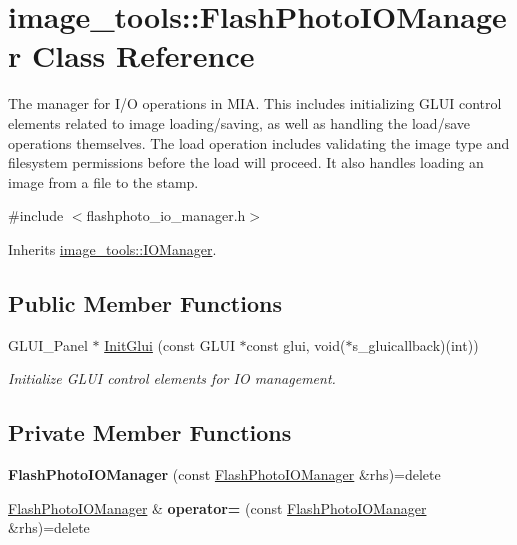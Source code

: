 \hypertarget{classimage__tools_1_1FlashPhotoIOManager}{}\section{image\+\_\+tools\+:\+:Flash\+Photo\+I\+O\+Manager Class Reference}
\label{classimage__tools_1_1FlashPhotoIOManager}


The manager for I/O operations in M\+IA. This includes initializing G\+L\+UI control elements related to image loading/saving, as well as handling the load/save operations themselves. The load operation includes validating the image type and filesystem permissions before the load will proceed. It also handles loading an image from a file to the stamp.  




{\ttfamily \#include $<$flashphoto\+\_\+io\+\_\+manager.\+h$>$}



Inherits \hyperlink{classimage__tools_1_1IOManager}{image\+\_\+tools\+::\+I\+O\+Manager}.

\subsection*{Public Member Functions}
\begin{DoxyCompactItemize}
\item 
G\+L\+U\+I\+\_\+\+Panel $\ast$ \hyperlink{classimage__tools_1_1FlashPhotoIOManager_a7acdb048b976e0efa9f4b65adf07faf8}{Init\+Glui} (const G\+L\+UI $\ast$const glui, void($\ast$s\+\_\+gluicallback)(int))
\begin{DoxyCompactList}\small\item\em Initialize G\+L\+UI control elements for IO management. \end{DoxyCompactList}\end{DoxyCompactItemize}
\subsection*{Private Member Functions}
\begin{DoxyCompactItemize}
\item 
{\bfseries Flash\+Photo\+I\+O\+Manager} (const \hyperlink{classimage__tools_1_1FlashPhotoIOManager}{Flash\+Photo\+I\+O\+Manager} \&rhs)=delete\hypertarget{classimage__tools_1_1FlashPhotoIOManager_ac29f81ca4d2878f3b52a9e2e562a0e9f}{}\label{classimage__tools_1_1FlashPhotoIOManager_ac29f81ca4d2878f3b52a9e2e562a0e9f}

\item 
\hyperlink{classimage__tools_1_1FlashPhotoIOManager}{Flash\+Photo\+I\+O\+Manager} \& {\bfseries operator=} (const \hyperlink{classimage__tools_1_1FlashPhotoIOManager}{Flash\+Photo\+I\+O\+Manager} \&rhs)=delete\hypertarget{classimage__tools_1_1FlashPhotoIOManager_a72220e79d2e47a7b00232649fee0c29a}{}\label{classimage__tools_1_1FlashPhotoIOManager_a72220e79d2e47a7b00232649fee0c29a}

\end{DoxyCompactItemize}
